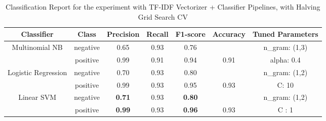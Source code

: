 \documentclass[11pt]{article}
\begin{document}
\begin{table}
    \centering
    \begin{tabular}{c c c c c c c} 
    \hline
       \textbf{Classifier}& \textbf{Class} & \textbf{Precision} &  \textbf{Recall} & \textbf{F1-score}  & \textbf{Accuracy} &\textbf{Tuned Parameters} \\ \hline 
       Multinomial NB & negative &0.65 &0.93  & 0.76 & & n\_gram: (1,3)\\
       & positive &0.99 &0.91 &0.94&0.91& alpha: 0.4\\ \hline 
       
       Logistic Regression & negative &0.70&0.93 & 0.80 & & n\_gram: (1,2) \\
       & positive&0.99 &0.93 &0.95&0.93&C: 10\\ \hline 
       
       Linear SVM & negative& \textbf{0.71} &0.93 &\textbf{0.80} & &n\_gram: (1,2)\\ 
       & positive & \textbf{0.99}&0.93& \textbf{0.96} &0.93&C : 1\\ \hline 
    \end{tabular}
    \caption{Classification Report for the experiment with TF-IDF Vectorizer + Classifier Pipelines, with Halving Grid Search CV }
    \label{tab:tfidf_class_report}
\end{table}
\end{document}
